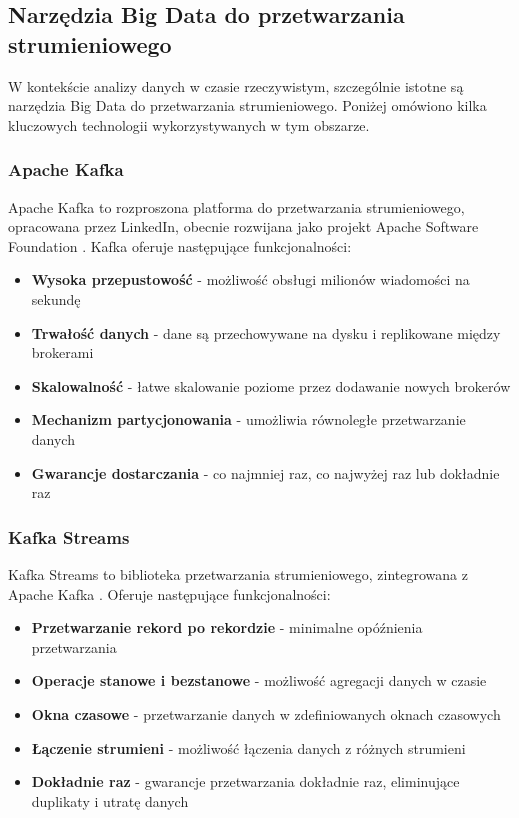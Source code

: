 \subsection{Narzędzia Big Data do przetwarzania strumieniowego}
\label{subsec:narzedzia_big_data}

W kontekście analizy danych w czasie rzeczywistym, szczególnie istotne są narzędzia Big Data do przetwarzania strumieniowego.
Poniżej omówiono kilka kluczowych technologii wykorzystywanych w tym obszarze.

\subsubsection{Apache Kafka}
\label{subsubsec:apache_kafka}

Apache Kafka to rozproszona platforma do przetwarzania strumieniowego, opracowana przez LinkedIn, obecnie rozwijana jako projekt
Apache Software Foundation \citep{kafka}. Kafka oferuje następujące funkcjonalności:

\begin{itemize}
    \item \textbf{Wysoka przepustowość} - możliwość obsługi milionów wiadomości na sekundę
    \item \textbf{Trwałość danych} - dane są przechowywane na dysku i replikowane między brokerami
    \item \textbf{Skalowalność} - łatwe skalowanie poziome przez dodawanie nowych brokerów
    \item \textbf{Mechanizm partycjonowania} - umożliwia równoległe przetwarzanie danych
    \item \textbf{Gwarancje dostarczania} - co najmniej raz, co najwyżej raz lub dokładnie raz
\end{itemize}

\subsubsection{Kafka Streams}
\label{subsubsec:kafka_streams}

Kafka Streams to biblioteka przetwarzania strumieniowego, zintegrowana z Apache Kafka \citep{kafka_streams}. Oferuje następujące funkcjonalności:

\begin{itemize}
    \item \textbf{Przetwarzanie rekord po rekordzie} - minimalne opóźnienia przetwarzania
    \item \textbf{Operacje stanowe i bezstanowe} - możliwość agregacji danych w czasie
    \item \textbf{Okna czasowe} - przetwarzanie danych w zdefiniowanych oknach czasowych
    \item \textbf{Łączenie strumieni} - możliwość łączenia danych z różnych strumieni
    \item \textbf{Dokładnie raz} - gwarancje przetwarzania dokładnie raz, eliminujące duplikaty i utratę danych
\end{itemize}

